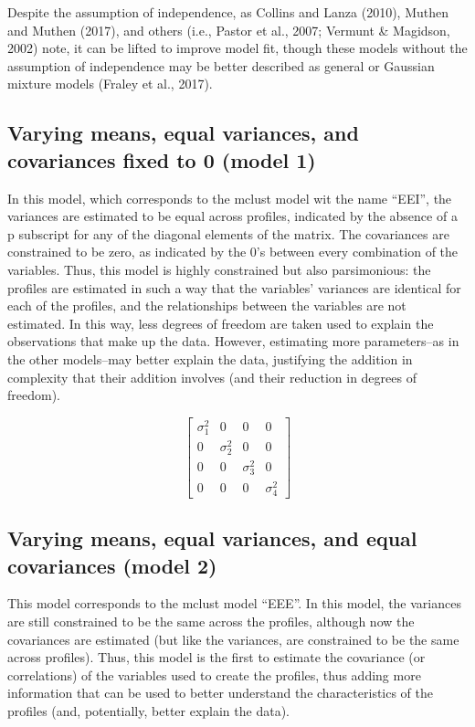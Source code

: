 \documentclass[]{book}
\theoremstyle{definition}
\theoremstyle{definition}
\theoremstyle{definition}
\theoremstyle{remark}
\begin{document}
Despite the assumption of independence, as Collins and Lanza (2010),
Muthen and Muthen (2017), and others (i.e., Pastor et al., 2007; Vermunt
\& Magidson, 2002) note, it can be lifted to improve model fit, though
these models without the assumption of independence may be better
described as general or Gaussian mixture models (Fraley et al., 2017).

\subsection{Varying means, equal variances, and covariances fixed to 0
(model
1)}\label{varying-means-equal-variances-and-covariances-fixed-to-0-model-1}

In this model, which corresponds to the mclust model wit the name
``EEI'', the variances are estimated to be equal across profiles,
indicated by the absence of a p subscript for any of the diagonal
elements of the matrix. The covariances are constrained to be zero, as
indicated by the 0's between every combination of the variables. Thus,
this model is highly constrained but also parsimonious: the profiles are
estimated in such a way that the variables' variances are identical for
each of the profiles, and the relationships between the variables are
not estimated. In this way, less degrees of freedom are taken used to
explain the observations that make up the data. However, estimating more
parameters--as in the other models--may better explain the data,
justifying the addition in complexity that their addition involves (and
their reduction in degrees of freedom).

\[
\left[ \begin{matrix} { \sigma }_{ 1 }^{ 2 } & 0 & 0 & 0 \\ 0 & { \sigma }_{ 2 }^{ 2 } & 0 & 0 \\ 0 & 0 & { \sigma }_{ 3 }^{ 2 } & 0 \\ 0 & 0 & 0 & { \sigma }_{ 4 }^{ 2 } \end{matrix} \right] 
\]

\subsection{Varying means, equal variances, and equal covariances (model
2)}\label{varying-means-equal-variances-and-equal-covariances-model-2}

This model corresponds to the mclust model ``EEE''. In this model, the
variances are still constrained to be the same across the profiles,
although now the covariances are estimated (but like the variances, are
constrained to be the same across profiles). Thus, this model is the
first to estimate the covariance (or correlations) of the variables used
to create the profiles, thus adding more information that can be used to
better understand the characteristics of the profiles (and, potentially,
better explain the data).
\end{document}

